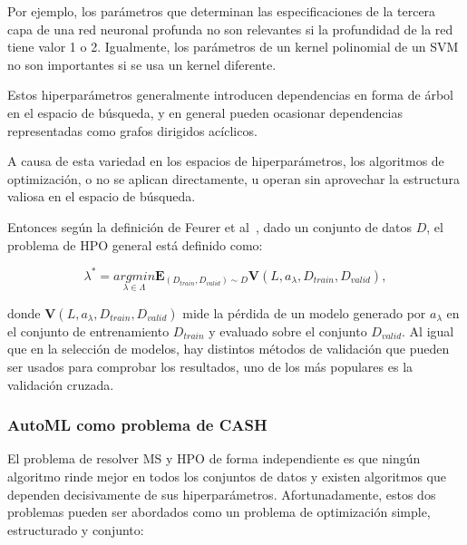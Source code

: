 Por ejemplo, los parámetros que determinan las especificaciones de la tercera capa de una red neuronal profunda no son relevantes si la profundidad de la red tiene valor 1 o 2. Igualmente, los parámetros de un kernel polinomial de un SVM no son importantes si se usa un kernel diferente.

Estos hiperparámetros generalmente introducen dependencias en forma de árbol en el espacio de búsqueda, y en general pueden ocasionar dependencias representadas como grafos dirigidos acíclicos.


A causa de esta variedad en los espacios de hiperparámetros, los algoritmos de optimización, o no se aplican directamente, u operan sin aprovechar la estructura valiosa en el espacio de búsqueda.

Entonces según la definición de Feurer et al~\cite{fuerer2019hyperparameter}, dado un conjunto de datos $D$, el problema de HPO general está definido como:

\begin{equation}
	\lambda^* = \underset{\lambda \in \Lambda}{argmin} \textbf{E}_{(D_{train}, D_{valid}) \sim  D}\textbf{V}(L, a_\lambda, D_{train}, D_{valid}),
\end{equation}

donde $\textbf{V}(L, a_\lambda, D_{train}, D_{valid})$ mide la pérdida de un modelo generado por $a_\lambda$ en el conjunto de entrenamiento $D_{train}$ y evaluado sobre el conjunto $D_{valid}$. Al igual que en la selección de modelos, hay distintos métodos de validación que pueden ser usados para comprobar los resultados, uno de los más populares es la validación cruzada.

\subsubsection{AutoML como problema de CASH} 

El problema de resolver MS y HPO de forma independiente es que ningún algoritmo rinde mejor en todos los conjuntos de datos y existen algoritmos que dependen decisivamente de sus hiperparámetros. Afortunadamente, estos dos problemas pueden ser abordados como un problema de optimización simple, estructurado y conjunto:

